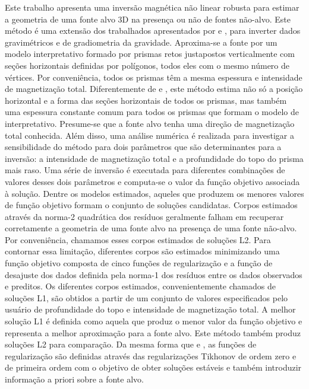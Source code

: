 Este trabalho apresenta uma inversão magnética não linear robusta para estimar a geometria de uma fonte alvo 3D na presença ou não de fontes não-alvo.
Este método é uma extensão dos trabalhados apresentados por \citet{oliveirajr_etal2011} e 
\citet{oliveirajr_barbosa2013}, para inverter dados gravimétricos e de gradiometria da gravidade.
Aproxima-se a fonte por um modelo interpretativo formado por prismas retos justapostos verticalmente com seções horizontais definidas por polígonos, todos eles com o mesmo número de vértices.
Por conveniência, todos os prismas têm a mesma espessura e intensidade de magnetização total.
Diferentemente de \citet{oliveirajr_etal2011} e \citet{oliveirajr_barbosa2013}, este método estima não só a posição horizontal e a forma das seções horizontais de todos os prismas, mas também uma espessura constante comum para todos os prismas que formam o modelo de interpretativo.
Presume-se que a fonte alvo tenha uma direção de magnetização total conhecida.
Além disso, uma análise numérica é realizada para investigar a sensibilidade do método para dois parâmetros que são determinantes para a inversão: a intensidade de magnetização total e a profundidade do topo do prisma mais raso.
Uma série de inversão é executada para diferentes combinações de valores desses dois parâmetros e computa-se o valor da função objetivo associada à solução.
Dentre os modelos estimados, aqueles que produzem os menores valores de função objetivo formam o conjunto de soluções candidatas.
Corpos estimados através da norma-2 quadrática dos resíduos geralmente falham em recuperar corretamente a geometria de uma fonte alvo na presença de uma fonte não-alvo.
Por conveniência, chamamos esses corpos estimados de soluções L2.
Para contornar essa limitação, diferentes corpos são estimados minimizando uma função objetivo composta de cinco funções de regularização e a função de desajuste dos dados definida pela norma-1 dos resíduos entre os dados observados e preditos.
Os diferentes corpos estimados, convenientemente chamados de soluções L1, são obtidos a partir de um conjunto de valores especificados pelo usuário de profundidade do topo e intensidade de magnetização total.
A melhor solução L1 é definida como aquela que produz o menor valor da função objetivo e representa a melhor aproximação para a fonte alvo.
Este método também produz soluções L2 para comparação.
Da mesma forma que \citet{oliveirajr_etal2011} e \citet{oliveirajr_barbosa2013}, as funções de regularização são definidas através das regularizações Tikhonov de ordem zero e de primeira ordem \citep[por exemplo,][p. 96 e 104]{aster_etal2019} com o objetivo de obter soluções estáveis e também introduzir informação a priori sobre a fonte alvo.

